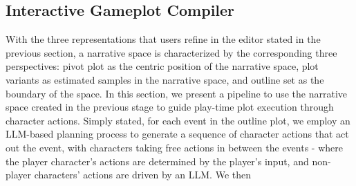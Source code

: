 \subsection{Interactive Gameplot Compiler}

\label{compiler}

With the three representations that users refine in the editor stated in the previous section, a narrative space is characterized by the corresponding three perspectives: pivot plot as the centric position of the narrative space, plot variants as estimated samples in the narrative space, and outline set as the boundary of the space. In this section, we present a pipeline to use the narrative space created in the previous stage to guide play-time plot execution through character actions. Simply stated, for each event in the outline plot, we employ an LLM-based planning process to generate a sequence of character actions that act out the event, with characters taking free actions in between the events - where the player character's actions are determined by the player's input, and non-player characters' actions are driven by an LLM. We then 





